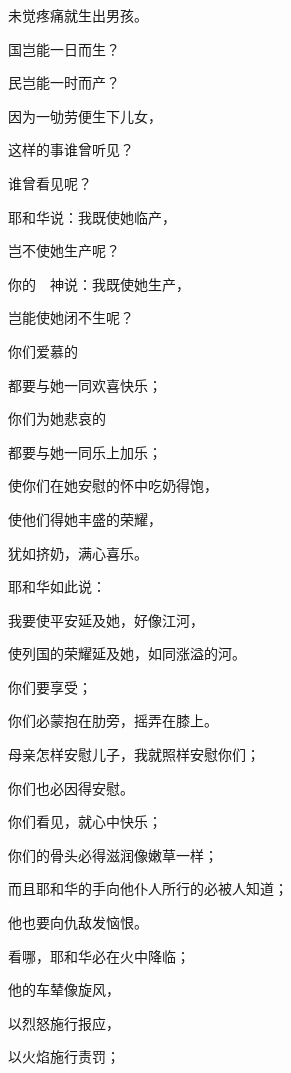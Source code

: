 {\par }{\Q 未觉疼痛就生出男孩。
\par }{\Q {}国岂能一日而生？
\par }{\Q 民岂能一时而产？
\par }{\Q 因为{}一劬劳便生下儿女，
\par }{\Q 这样的事谁曾听见？
\par }{\Q 谁曾看见呢？
\par }{\Q {}耶和华说：我既使她临产，
\par }{\Q 岂不使她生产呢？
\par }{\Q 你的　神说：我既使她生产，
\par }{\Q 岂能使她闭{}不生呢？
\par }{\BB \par }{\Q {}你们爱慕{}的
\par }{\Q 都要与她一同欢喜快乐；
\par }{\Q 你们为她悲哀的
\par }{\Q 都要与她一同乐上加乐；
\par }{\Q {}使你们在她安慰的怀中吃奶得饱，
\par }{\Q 使他们得她丰盛的荣耀，
\par }{\Q 犹如挤奶，满心喜乐。
\par }{\BB \par }{\Q {}耶和华如此说：
\par }{\Q 我要使平安延及她，好像江河，
\par }{\Q 使列国的荣耀延及她，如同涨溢的河。
\par }{\Q 你们要{}享受；
\par }{\Q 你们必蒙抱在肋旁，摇弄在膝上。
\par }{\Q {}母亲怎样安慰儿子，我就照样安慰你们；
\par }{\Q 你们也必因得安慰。
\par }{\Q {}你们看见，就心中快乐；
\par }{\Q 你们的骨头必得滋润像嫩草一样；
\par }{\Q 而且耶和华的手向他仆人所行的必被人知道；
\par }{\Q 他也要向仇敌发恼恨。
\par }{\BB \par }{\Q {}看哪，耶和华必在火中降临；
\par }{\Q 他的车辇像旋风，
\par }{\Q 以烈怒施行报应，
\par }{\Q 以火焰施行责罚；
}
